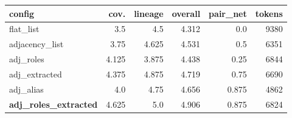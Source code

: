 \begin{tabular}{lrrrrr}
\toprule
config & cov. & lineage & overall & pair\_net & tokens \\
\midrule
flat\_list & 3.5 & 4.5 & 4.312 & 0.0 & 9380 \\
adjacency\_list & 3.75 & 4.625 & 4.531 & 0.5 & 6351 \\
adj\_roles & 4.125 & 3.875 & 4.438 & 0.25 & 6844 \\
adj\_extracted & 4.375 & 4.875 & 4.719 & 0.75 & 6690 \\
adj\_alias & 4.0 & 4.75 & 4.656 & 0.875 & 4862 \\
\textbf{adj\_roles\_extracted} & 4.625 & 5.0 & 4.906 & 0.875 & 6824 \\
\bottomrule
\end{tabular}
